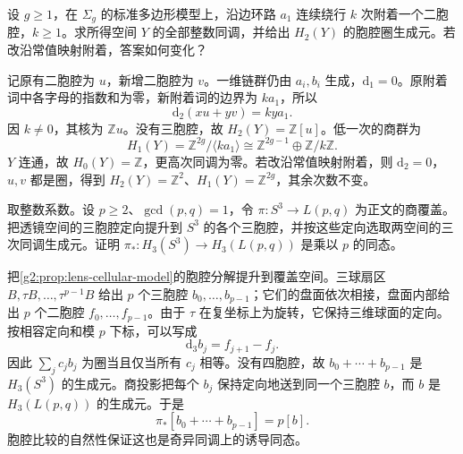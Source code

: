 \begin{exercise}\label{g2:ex:surface-extra-two-cell}
	设 \(g\geq1\)，在 \(\Sigma_g\) 的标准多边形模型上，沿边环路 \(a_1\) 连续绕行 \(k\) 次附着一个二胞腔，\(k\geq1\)。求所得空间 \(Y\) 的全部整数同调，并给出 \(H_2(Y)\) 的胞腔圈生成元。若改沿常值映射附着，答案如何变化？
\end{exercise}
\begin{solution}
	记原有二胞腔为 \(u\)，新增二胞腔为 \(v\)。一维链群仍由 \(a_i,b_i\) 生成，\(\mathrm{d}_1=0\)。原附着词中各字母的指数和为零，新附着词的边界为 \(k a_1\)，所以
	\[
		\mathrm{d}_2(xu+yv)=ky a_1.
	\]
	因 \(k\ne0\)，其核为 \(\mathbb Zu\)。没有三胞腔，故 \(H_2(Y)=\mathbb Z[u]\)。低一次的商群为
	\[
		H_1(Y)=\mathbb Z^{2g}/\langle k a_1\rangle
		\cong\mathbb Z^{2g-1}\oplus\mathbb Z/k\mathbb Z.
	\]
	\(Y\) 连通，故 \(H_0(Y)=\mathbb Z\)，更高次同调为零。若改沿常值映射附着，则 \(\mathrm{d}_2=0\)，\(u,v\) 都是圈，得到 \(H_2(Y)=\mathbb Z^2\)、\(H_1(Y)=\mathbb Z^{2g}\)，其余次数不变。
\end{solution}

\begin{exercise}\label{g2:ex:lens-cover-top-homology}
	取整数系数。设 \(p\geq2\)、\(\gcd(p,q)=1\)，令 \(\pi:S^3\to L(p,q)\) 为正文的商覆盖。把透镜空间的三胞腔定向提升到 \(S^3\) 的各个三胞腔，并按这些定向选取两空间的三次同调生成元。证明 \(\pi_*:H_3(S^3)\to H_3(L(p,q))\) 是乘以 \(p\) 的同态。
\end{exercise}
\begin{solution}
	把\cref{g2:prop:lens-cellular-model}的胞腔分解提升到覆盖空间。三球扇区 \(B,\tau B,\ldots,\tau^{p-1}B\) 给出 \(p\) 个三胞腔 \(b_0,\ldots,b_{p-1}\)；它们的盘面依次相接，盘面内部给出 \(p\) 个二胞腔 \(f_0,\ldots,f_{p-1}\)。由于 \(\tau\) 在复坐标上为旋转，它保持三维球面的定向。按相容定向和模 \(p\) 下标，可以写成
	\[
		\mathrm{d}_3 b_j=f_{j+1}-f_j.
	\]
	因此 \(\sum_j c_j b_j\) 为圈当且仅当所有 \(c_j\) 相等。没有四胞腔，故 \(b_0+\cdots+b_{p-1}\) 是 \(H_3(S^3)\) 的生成元。商投影把每个 \(b_j\) 保持定向地送到同一个三胞腔 \(b\)，而 \(b\) 是 \(H_3(L(p,q))\) 的生成元。于是
	\[
		\pi_*[b_0+\cdots+b_{p-1}]=p[b].
	\]
	胞腔比较的自然性保证这也是奇异同调上的诱导同态。
\end{solution}

